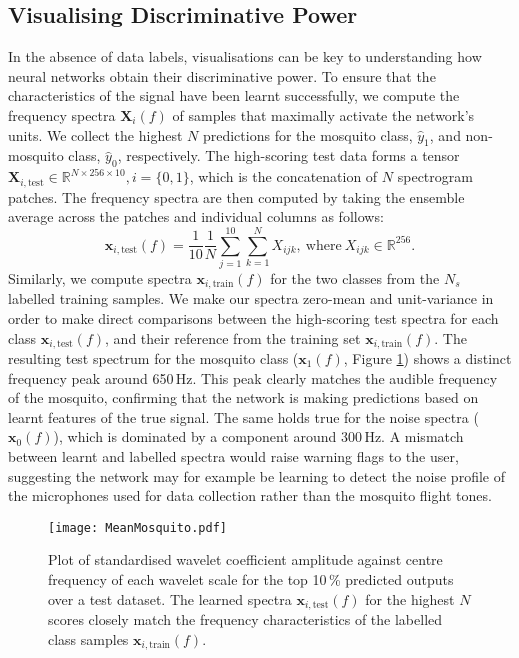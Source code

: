 \documentclass[10pt, twocolumn]{llncs}
\begin{document}
\subsection{Visualising Discriminative Power}
\label{subsec:visual}
In the absence of data labels, visualisations can be key to understanding how neural networks obtain their discriminative power. To ensure that the characteristics of the signal have been learnt successfully, we compute the frequency spectra $\mathbf{X}_i(f)$ of samples that maximally activate the network's units. We collect the highest $N$ predictions for the mosquito class, $\hat{y}_1$, and non-mosquito class, $\hat{y}_0$, respectively.
The high-scoring test data forms a tensor $\mathbf{X}_{i,\text{test}} \in \mathbb{R}^{N\times 256  \times 10}, i = \{0,1\}$, which is the concatenation of $N$ spectrogram patches. The frequency spectra are then computed by taking the ensemble average across the patches and individual columns as follows:
\begin{equation}
\mathbf{x}_{i,\text{test}}(f) = \frac{1}{10}\frac{1}{N}\sum_{j=1}^{10} \sum_{k=1}^{N} X_{ijk}, \ \mbox{where} \ X_{ijk} \in \mathbb{R}^{256}.
\end{equation}
Similarly, we compute spectra $\mathbf{x}_{i,\text{train}}(f)$ for the two classes from the $N_s$ labelled training samples.
We make our spectra zero-mean and unit-variance in order to make direct comparisons between the high-scoring test spectra for each class $\mathbf{x}_{i,\text{test}}(f)$, and their reference from the training set $\mathbf{x}_{i,\text{train}}(f)$. The resulting test spectrum for the mosquito class ($\mathbf{x}_{1}(f)$, Figure \ref{fig:Resultsmeans}) shows a distinct frequency peak around 650\,Hz. This peak clearly matches the audible frequency of the mosquito, confirming that the network is making predictions based on learnt features of the true signal. The same holds true for the noise spectra ($\mathbf{x}_{0}(f)$), which is dominated by a component around 300\,Hz. A mismatch between learnt and labelled spectra would raise warning flags to the user, suggesting the network may for example be learning to detect the noise profile of the microphones used for data collection rather than the mosquito flight tones.


\begin{figure}[t]
\centering

    \texttt{[image: MeanMosquito.pdf]}
\caption{Plot of standardised wavelet coefficient amplitude against centre frequency of each wavelet scale for the top 10\,\% predicted outputs over a test dataset. The learned spectra $\mathbf{x}_{i,\text{test}}(f)$ for the highest $N$ scores closely match the frequency characteristics of the labelled class samples $\mathbf{x}_{i, \textrm{train}}(f)$.}
\label{fig:Resultsmeans}
\end{figure}
\end{document}
